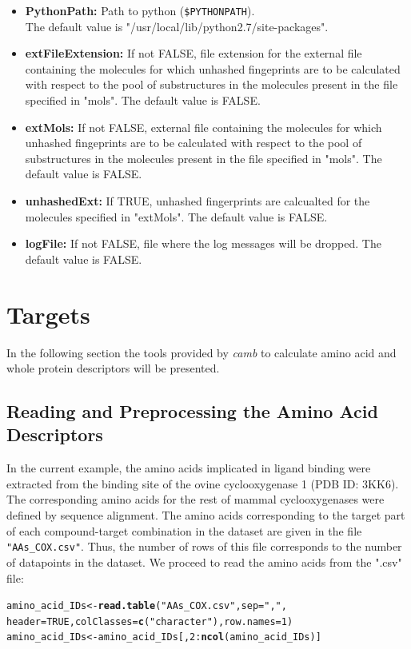 \documentclass[twoside,a4wide,12pt]{article}\usepackage[]{graphicx}\usepackage[]{color}
\makeatletter
\newcommand{\hlnum}[1]{\textcolor[rgb]{0.686,0.059,0.569}{#1}}%
\newcommand{\hlstr}[1]{\textcolor[rgb]{0.192,0.494,0.8}{#1}}%
\newcommand{\hlopt}[1]{\textcolor[rgb]{0,0,0}{#1}}%
\newcommand{\hlstd}[1]{\textcolor[rgb]{0.345,0.345,0.345}{#1}}%
\newcommand{\hlkwb}[1]{\textcolor[rgb]{0.69,0.353,0.396}{#1}}%
\newcommand{\hlkwc}[1]{\textcolor[rgb]{0.333,0.667,0.333}{#1}}%
\newcommand{\hlkwd}[1]{\textcolor[rgb]{0.737,0.353,0.396}{\textbf{#1}}}%
\newenvironment{kframe}{%
 \def\at@end@of@kframe{}%
 \ifinner\ifhmode%
  \def\at@end@of@kframe{\end{minipage}}%
  \begin{minipage}{\columnwidth}%
 \fi\fi%
 \def\FrameCommand##1{\hskip\@totalleftmargin \hskip-\fboxsep
 \colorbox{shadecolor}{##1}\hskip-\fboxsep
     \hskip-\linewidth \hskip-\@totalleftmargin \hskip\columnwidth}%
 \MakeFramed {\advance\hsize-\width
   \@totalleftmargin\z@ \linewidth\hsize
   \@setminipage}}%
 {\par\unskip\endMakeFramed%
 \at@end@of@kframe}
\newenvironment{knitrout}{}{} %
\makeatother
\begin{document}
\begin{itemize}
\item {\bf PythonPath:} Path to python (\verb|$PYTHONPATH|).\\
The default value is "/usr/local/lib/python2.7/site-packages".
\item {\bf extFileExtension:} If not FALSE, file extension for the external file containing the molecules for which unhashed fingeprints are to be calculated with respect to the pool of substructures in the molecules present in the file specified in "mols". The default value is FALSE.
\item {\bf extMols:} If not FALSE, external file containing the molecules for which unhashed fingeprints are to be calculated with respect to the pool of
substructures in the molecules present in the file specified in "mols". The default value is FALSE.
\item {\bf unhashedExt:} If TRUE, unhashed fingerprints are calcualted for the molecules specified in "extMols". The default value is FALSE.
\item {\bf logFile:} If not FALSE, file where the log messages will be dropped. The default value is FALSE.
\end{itemize}


\section{Targets}

In the following section the tools provided by {\it camb} to calculate amino acid and whole protein descriptors will be presented.

\subsection{Reading and Preprocessing the Amino Acid Descriptors}
In the current example, the amino acids implicated in ligand binding were extracted from the binding site of the ovine cyclooxygenase 1 (PDB ID: 3KK6). The corresponding amino acids for the rest of mammal cyclooxygenases were defined by sequence alignment.
The amino acids corresponding to the target part of each compound-target combination in the dataset are given in the file \verb|"AAs_COX.csv"|. Thus, the number of rows of this file corresponds to the number of datapoints in the dataset.
We proceed to read the amino acids from the ".csv" file:
\begin{knitrout}
\color{fgcolor}\begin{kframe}
\begin{alltt}
\hlstd{amino_acid_IDs} \hlkwb{<-} \hlkwd{read.table}\hlstd{(}\hlstr{"AAs_COX.csv"}\hlstd{,} \hlkwc{sep} \hlstd{=} \hlstr{","}\hlstd{,}
    \hlkwc{header} \hlstd{=} \hlnum{TRUE}\hlstd{,} \hlkwc{colClasses} \hlstd{=} \hlkwd{c}\hlstd{(}\hlstr{"character"}\hlstd{),} \hlkwc{row.names} \hlstd{=} \hlnum{1}\hlstd{)}
\hlstd{amino_acid_IDs} \hlkwb{<-} \hlstd{amino_acid_IDs[,} \hlnum{2}\hlopt{:}\hlkwd{ncol}\hlstd{(amino_acid_IDs)]}
\end{alltt}
\end{kframe}
\end{knitrout}
\end{document}
